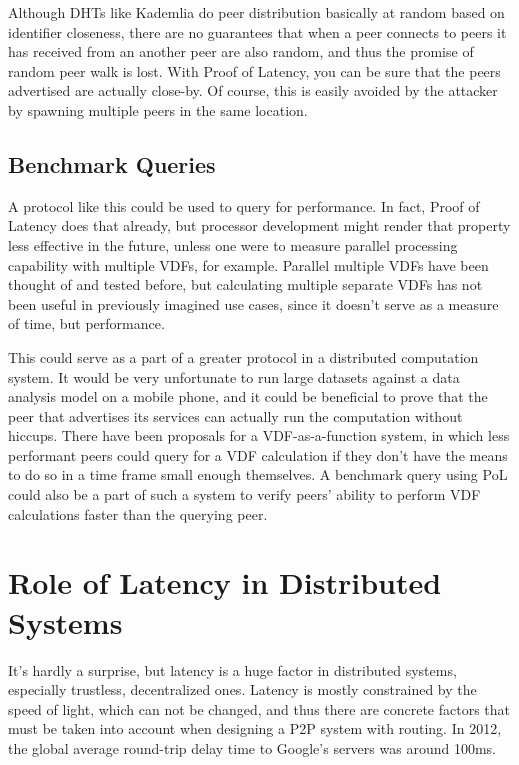 Although DHTs like Kademlia do peer distribution basically at random based on identifier closeness, there are no guarantees that when a peer connects to peers it has received from an another peer are also random, and thus the promise of random peer walk is lost. With Proof of Latency, you can be sure that the peers advertised are actually close-by. Of course, this is easily avoided by the attacker by spawning multiple peers in the same location.

\subsection{Benchmark Queries}
A protocol like this could be used to query for performance. In fact, Proof of Latency does that already, but processor development might render that property less effective in the future, unless one were to measure parallel processing capability with multiple VDFs, for example. Parallel multiple VDFs have been thought of and tested before, but calculating multiple separate VDFs has not been useful in previously imagined use cases, since it doesn't serve as a measure of time, but performance.

This could serve as a part of a greater protocol in a distributed computation system. It would be very unfortunate to run large datasets against a data analysis model on a mobile phone, and it could be beneficial to prove that the peer that advertises its services can actually run the computation without hiccups.
There have been proposals for a VDF-as-a-function system, in which less performant peers could query for a VDF calculation if they don't have the means to do so in a time frame small enough themselves. A benchmark query using PoL could also be a part of such a system to verify peers' ability to perform VDF calculations faster than the querying peer.

\section{Role of Latency in Distributed Systems}
It's hardly a surprise, but latency is a huge factor in distributed systems, especially trustless, decentralized ones. Latency is mostly constrained by the speed of light, which can not be changed, and thus there are concrete factors that must be taken into account when designing a P2P system with routing. In 2012, the global average round-trip delay time to Google's servers was around 100ms.~\cite{Grigorik_undated-mc}

